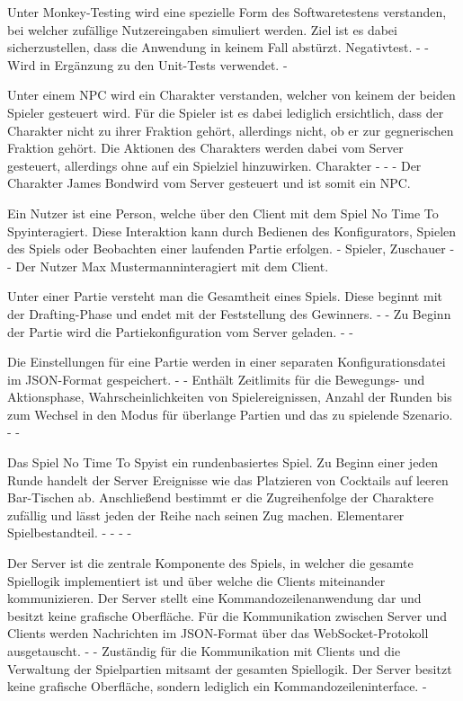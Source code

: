 {Unter Monkey-Testing wird eine spezielle Form des Softwaretestens verstanden, bei welcher zufällige Nutzereingaben simuliert werden. Ziel ist es dabei sicherzustellen, dass die Anwendung in keinem Fall abstürzt.}
{Negativtest.}
{-}
{-}
{Wird in Ergänzung zu den Unit-Tests verwendet.}
{-}

{Unter einem NPC wird ein Charakter verstanden, welcher von keinem der beiden Spieler gesteuert wird. Für die Spieler ist es dabei lediglich ersichtlich, dass der Charakter nicht zu ihrer Fraktion gehört, allerdings nicht, ob er zur gegnerischen Fraktion gehört. Die Aktionen des Charakters werden dabei vom Server gesteuert, allerdings ohne auf ein Spielziel hinzuwirken.}
{Charakter}
{-}
{-}
{-}
{Der Charakter \glqq James Bond\grqq wird vom Server gesteuert und ist somit ein NPC.}

{Ein Nutzer ist eine Person, welche über den Client mit dem Spiel  \glqq No Time To Spy\grqq interagiert. Diese Interaktion kann durch Bedienen des Konfigurators, Spielen des Spiels oder Beobachten einer laufenden Partie erfolgen.}
{-}
{Spieler, Zuschauer}
{-}
{-}
{Der Nutzer \glqq Max Mustermann\grqq  interagiert mit dem Client.}

{Unter einer Partie versteht man die Gesamtheit eines Spiels. Diese beginnt mit der Drafting-Phase und endet mit der Feststellung des Gewinners.}
{-}
{-}
{Zu Beginn der Partie wird die Partiekonfiguration vom Server geladen.}
{-}
{-}

{Die Einstellungen für eine Partie werden in einer separaten Konfigurationsdatei im JSON-Format gespeichert. }
{-}
{-}
{Enthält Zeitlimits für die Bewegungs- und Aktionsphase, Wahrscheinlichkeiten von Spielereignissen, Anzahl der Runden bis zum Wechsel in den Modus für überlange Partien und das zu spielende Szenario.}
{-}
{-}

{Das Spiel \glqq No Time To Spy\grqq ist ein rundenbasiertes Spiel. Zu Beginn einer jeden Runde handelt der Server Ereignisse wie das Platzieren von Cocktails auf leeren Bar-Tischen ab. Anschließend bestimmt er die Zugreihenfolge der Charaktere zufällig und lässt jeden der Reihe nach seinen Zug machen. }
{Elementarer Spielbestandteil.}
{-}
{-}
{-}
{-}

{Der Server ist die zentrale Komponente des Spiels, in welcher die gesamte Spiellogik implementiert ist und über welche die Clients miteinander kommunizieren. Der Server stellt eine Kommandozeilenanwendung dar und besitzt keine grafische Oberfläche. Für die Kommunikation zwischen Server und Clients werden Nachrichten im JSON-Format über das WebSocket-Protokoll ausgetauscht.}
{-}
{-}
{Zuständig für die Kommunikation mit Clients und die Verwaltung der Spielpartien mitsamt der gesamten Spiellogik.}
{Der Server besitzt keine grafische Oberfläche, sondern lediglich ein Kommandozeileninterface.}
{-}


